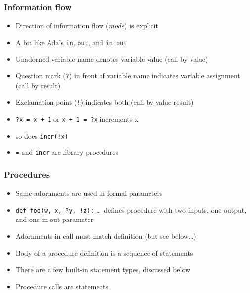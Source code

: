 \documentclass[12pt]{beamer}
\begin{document}
\begin{frame}
\frametitle{Information flow}
\begin{itemize}
\item Direction of information flow (\emph{mode}) is explicit
\item A bit like Ada's \texttt{in}, \texttt{out}, and \texttt{in out}
\item Unadorned variable name denotes variable value (call by value)
\item Question mark (\texttt{?}) in front of variable name indicates
  variable assignment (call by result)
\item Exclamation point (\texttt{!}) indicates both (call by value-result)
\item \texttt{?x = x + 1} or \texttt{x + 1 = ?x} increments x
\item so does \texttt{incr(!x)}
\item \texttt{=} and \texttt{incr} are library procedures
\end{itemize}
\end{frame}


\begin{frame}
\frametitle{Procedures}
\begin{itemize}
\item Same adornments are used in formal parameters
\item \texttt{def foo(w, x, ?y, !z):} \ldots\ defines procedure with two
  inputs, one output, and one in-out parameter
\item Adornments in call must match definition (but see below\ldots)
\item Body of a procedure definition is a sequence of
  statements
\item There are a few built-in statement types, discussed below
\item Procedure calls are statements
\end{itemize}
\end{frame}
\end{document}
